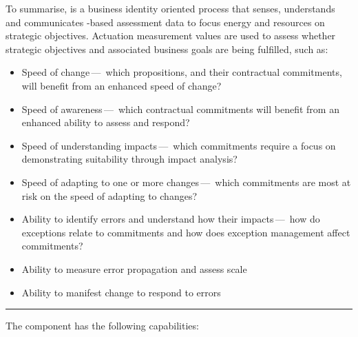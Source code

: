 To summarise, \textbf{} is a business identity oriented process
that senses, understands and communicates -based assessment data to focus energy and
resources on strategic objectives.
Actuation measurement values are used to assess whether strategic objectives and associated business goals are
being fulfilled, such as:

\begin{itemize}
    \item Speed of change\,---\,%
    which propositions, and their contractual commitments, will benefit from an enhanced speed of change?

    \item Speed of awareness\,---\,%
    which contractual commitments will benefit from an enhanced ability to assess and respond?

    \item Speed of understanding impacts\,---\,%
    which commitments require a focus on demonstrating suitability through impact analysis?

    \item Speed of adapting to one or more changes\,---\,%
    which commitments are most at risk on the speed of adapting to changes?

    \item Ability to identify errors and understand how their impacts\,---\,%
          how do exceptions relate to commitments and how does exception management affect commitments?
    \item Ability to measure error propagation and assess scale
    \item Ability to manifest change to respond to errors
\end{itemize}

\vspace{1cm}
\hrule

The  component has the following capabilities:

\begin{itemize}[leftmargin=.5in]
\end{itemize}




